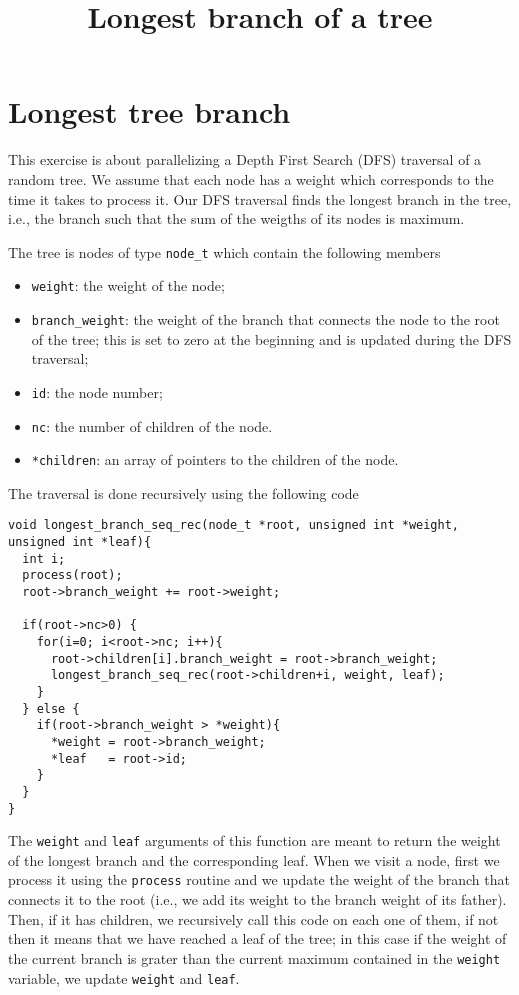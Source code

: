 \documentclass{article}
\title{Longest branch of a tree}
\date{}
\begin{document}
\maketitle

\section{Longest tree branch}

This exercise is about parallelizing a Depth First Search (DFS) traversal of
a random tree. We assume that each node has a weight which corresponds
to the time it takes to process it. Our DFS traversal finds the
longest branch in the tree, i.e., the branch such that the sum of the
weigths of its nodes is maximum. 

The tree is nodes of type \texttt{node\_t} which contain the following members

\begin{itemize}
\item \texttt{weight}: the weight of the node;
\item \texttt{branch\_weight}: the weight of the branch that connects
  the node to the root of the tree; this is set to zero at the
  beginning and is updated during the DFS traversal;
\item \texttt{id}: the node number;
\item \texttt{nc}: the number of children of the node.
\item \texttt{*children}: an array of pointers to the children of the node.
\end{itemize}

The traversal is done recursively using the following code

\begin{verbatim}
void longest_branch_seq_rec(node_t *root, unsigned int *weight, unsigned int *leaf){
  int i;
  process(root);
  root->branch_weight += root->weight;
  
  if(root->nc>0) {
    for(i=0; i<root->nc; i++){
      root->children[i].branch_weight = root->branch_weight;
      longest_branch_seq_rec(root->children+i, weight, leaf);
    }
  } else {
    if(root->branch_weight > *weight){
      *weight = root->branch_weight;
      *leaf   = root->id;
    }
  }
}
\end{verbatim}

The \texttt{weight} and \texttt{leaf} arguments of this function are
meant to return the weight of the longest branch and the corresponding
leaf.  When we visit a node, first we process it using the
\texttt{process} routine and we update the weight of the branch that
connects it to the root (i.e., we add its weight to the branch weight
of its father).  Then, if it has children, we recursively call this
code on each one of them, if not then it means that we have reached a
leaf of the tree; in this case if the weight of the current branch is
grater than the current maximum contained in the \texttt{weight}
variable, we update \texttt{weight} and \texttt{leaf}.
\end{document}
